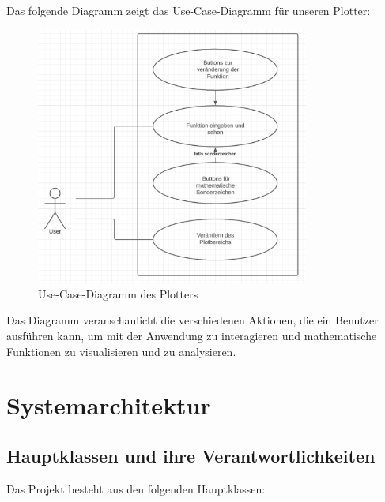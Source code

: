 \documentclass[a4paper]{article}
\begin{document}
Das folgende Diagramm zeigt das Use-Case-Diagramm für unseren Plotter:

\begin{figure}[h]
\centering
\includegraphics[width=0.8\textwidth]{Resources/use-case-diagram.png}
\caption{Use-Case-Diagramm des Plotters}
\label{fig:use_case_diagram}
\end{figure}

Das Diagramm veranschaulicht die verschiedenen Aktionen, die ein Benutzer ausführen kann, um mit der Anwendung zu interagieren und mathematische Funktionen zu visualisieren und zu analysieren.

\newpage

\section{Systemarchitektur}

\subsection{Hauptklassen und ihre Verantwortlichkeiten}

Das Projekt besteht aus den folgenden Hauptklassen:
\end{document}
